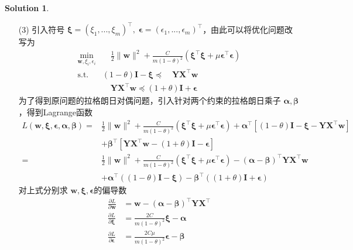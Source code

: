 \documentclass[a4paper,UTF8]{article}
\numberwithin{equation}{section}
\theoremstyle{definition}
\newtheorem*{solution}{Solution}
\def \X {\boldsymbol{X}}
\def \Y {\boldsymbol{Y}}
\def \w {\boldsymbol{w}}
\def \bdalpha {\boldsymbol{\alpha}}
\def \bdbeta {\boldsymbol{\beta}}
\def \bdxi {\boldsymbol{\xi}}
\def \bdepsilon {\boldsymbol{\epsilon}}
\begin{document}
\begin{solution}
\begin{enumerate}
        \item[(3)]
        引入符号 $\boldsymbol{\xi} = (\xi_1, ..., \xi_m)^\top, \; \boldsymbol{\epsilon} = (\epsilon_1, ..., \epsilon_m)^\top$，由此可以将优化问题改写为
        \begin{align*}
            \min_{\w, \xi_i, \epsilon_i} 
            & \quad \frac12 \|\w\|^2 + \frac{C}{m(1-\theta)^2} (\boldsymbol{\xi}^\top \boldsymbol{\xi}+ \mu \boldsymbol{\epsilon}^\top \boldsymbol{\epsilon}) \\
            \text{s.t.} 
            & (1-\theta)\mathbf{I} - \boldsymbol{\xi} \preceq \quad \Y\X^\top \w    \\
            &\quad \Y\X^\top \w \preceq  (1+\theta)\mathbf{I} + \boldsymbol{\epsilon}
        \end{align*} 
        为了得到原问题的拉格朗日对偶问题，引入针对两个约束的拉格朗日乘子 $\mathbf{\alpha}, \mathbf{\beta}$，得到Lagrange函数
        \begin{align*}
          L(\w,\boldsymbol{\xi}, \boldsymbol{\epsilon}, \boldsymbol{\alpha}, \boldsymbol{\beta}) = 
          &  \frac12 \|\w\|^2 + \frac{C}{m(1-\theta)^2} (\boldsymbol{\xi}^\top \boldsymbol{\xi}+ \mu \boldsymbol{\epsilon}^\top \boldsymbol{\epsilon}) + \boldsymbol{\alpha}^\top \left[ (1-\theta)\mathbf{I}-\boldsymbol{\xi} -\Y\X^\top \w \right] \\
          & + \boldsymbol{\beta}^\top\left[ \Y\X^\top\w - (1+\theta)\mathbf{I}-\boldsymbol{\epsilon} \right] \\
        = & \frac12 \|\w\|^2 + \frac{C}{m(1-\theta)^2} (\boldsymbol{\xi}^\top \boldsymbol{\xi}+ \mu \boldsymbol{\epsilon}^\top \boldsymbol{\epsilon}) - (\boldsymbol{\alpha} - \boldsymbol{\beta})^\top \Y\X^\top \w \\
          & + \boldsymbol{\alpha}^\top ((1-\theta)\mathbf{I}-\boldsymbol{\xi}) - \boldsymbol{\beta}^\top ((1+\theta)\mathbf{I}+\boldsymbol{\epsilon})
        \end{align*}
        对上式分别求 $\w, \boldsymbol{\xi}, \boldsymbol{\epsilon}$的偏导数
        \begin{align*}
            \frac{\partial L}{\partial \w} &= \w - (\bdalpha - \bdbeta)^\top \Y\X^\top \\
            \frac{\partial L}{\partial \bdxi} &= \frac{2C}{m(1-\theta)^2}\bdxi - \bdalpha \\
            \frac{\partial L}{\partial \bdepsilon} &= \frac{2C \mu}{m(1-\theta)^2}\bdepsilon - \bdbeta
        \end{align*}


\end{enumerate}
\end{solution}
\end{document}
